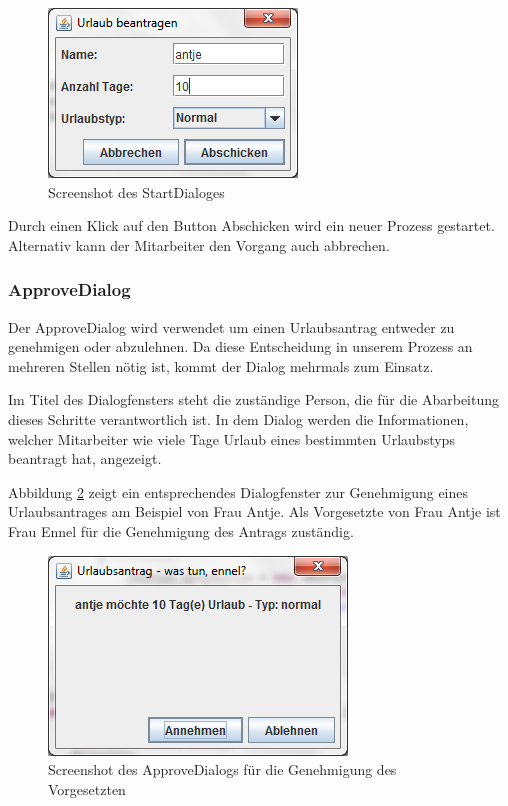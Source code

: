 \begin{figure}[H]
	\centering
	\includegraphics[width=0.4\linewidth]{Bilder/DialogUrlaubBeantragen}
	\caption{Screenshot des StartDialoges}
	\label{fig:DialogUrlaubBeantragen}
\end{figure}

Durch einen Klick auf den Button Abschicken wird ein neuer Prozess gestartet. Alternativ kann der Mitarbeiter den Vorgang auch abbrechen.

\subsubsection{ApproveDialog}
Der ApproveDialog wird verwendet um einen Urlaubsantrag entweder zu genehmigen oder abzulehnen. Da diese Entscheidung in unserem Prozess an mehreren Stellen nötig ist, kommt der Dialog mehrmals zum Einsatz.

Im Titel des Dialogfensters steht die zuständige Person, die für die Abarbeitung dieses Schritte verantwortlich ist. In dem Dialog werden die Informationen, welcher Mitarbeiter wie viele Tage Urlaub eines bestimmten Urlaubstyps beantragt hat, angezeigt.

Abbildung \ref{fig:DialogVorgesetzteGenehmigung} zeigt ein entsprechendes Dialogfenster zur Genehmigung eines Urlaubsantrages am Beispiel von Frau Antje. Als Vorgesetzte von Frau Antje ist Frau Ennel für die Genehmigung des Antrags zuständig.

\begin{figure}[H]
	\centering
	\includegraphics[width=0.5\linewidth]{Bilder/DialogVorgesetzteGenehmigung}
	\caption{Screenshot des ApproveDialogs für die Genehmigung des Vorgesetzten}
	\label{fig:DialogVorgesetzteGenehmigung}
\end{figure}

